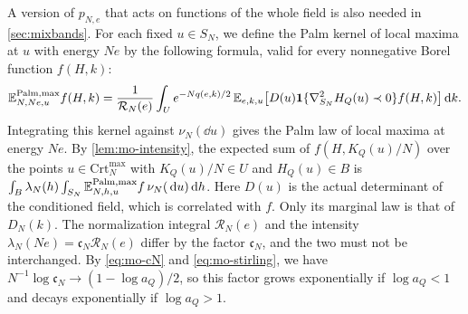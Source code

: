A version of $p_{N,e}$ that acts on functions of the whole field is also needed in \cref{sec:mixbands}. For each fixed $u\in S_N$, we define the Palm kernel of local maxima at $u$ with energy $Ne$ by the following formula, valid for every nonnegative Borel function $f(H,k)$:
\begin{equation}\label{eq:mo-full-palm}
\mathbb E^{\mathrm{Palm},\max}_{N,Ne,u}f(H,k)=\frac1{\mathcal R_N(e)}\int_Ue^{-Nq(e,k)/2}\,\mathbb E_{e,k,u}\bigl[D(u)\mathbf 1\{\nabla_{S_N}^2H_Q(u)\prec0\}f(H,k)\bigr]\,\mathrm d k.
\end{equation}
Integrating this kernel against $\nu_N(\dd u)$ gives the Palm law of local maxima at energy $Ne$. By \cref{lem:mo-intensity}, the expected sum of $f(H,K_Q(u)/N)$ over the points $u\in\mathrm{Crt}_N^{\max}$ with $K_Q(u)/N\in U$ and $H_Q(u)\in B$ is $\int_B\lambda_N(h)\int_{S_N}\mathbb E^{\mathrm{Palm},\max}_{N,h,u}f\,\nu_N(\,\mathrm d u)\,\mathrm d h$.
Here $D(u)$ is the actual determinant of the conditioned field, which is correlated with $f$. Only its marginal law is that of $D_N(k)$. The normalization integral $\mathcal R_N(e)$ and the intensity $\lambda_N(Ne)=\mathfrak c_N\mathcal R_N(e)$ differ by the factor $\mathfrak c_N$, and the two must not be interchanged. By \eqref{eq:mo-cN} and \eqref{eq:mo-stirling}, we have $N^{-1}\log\mathfrak c_N\to(1-\log a_Q)/2$, so this factor grows exponentially if $\log a_Q<1$ and decays exponentially if $\log a_Q>1$.

